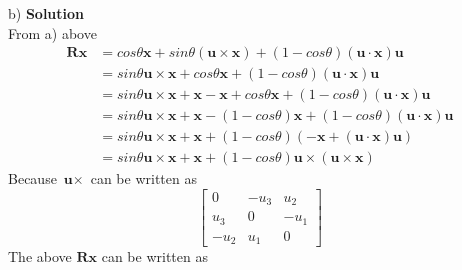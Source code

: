 \documentclass[letterpaper, 11pt]{article}
\begin{document}
b)
\textbf{Solution}\\
From a) above
\begin{align*}
    \textbf{R}\textbf{x} & =cos\theta\textbf{x} + sin\theta (\textbf{u} \times  \textbf{x}) +
    (1-cos\theta)(\textbf{u} \cdot \textbf{x})\textbf{u}                                                              \\
                         & = sin\theta \textbf{u} \times  \textbf{x}+cos\theta\textbf{x} +
    (1-cos\theta)(\textbf{u} \cdot \textbf{x})\textbf{u}                                                              \\
                         & = sin\theta \textbf{u} \times  \textbf{x}+ \textbf{x} - \textbf{x} + cos\theta\textbf{x} +
    (1-cos\theta)(\textbf{u} \cdot \textbf{x})\textbf{u}                                                              \\
                         & = sin\theta \textbf{u} \times  \textbf{x}+ \textbf{x} - (1-cos\theta)\textbf{x} +
    (1-cos\theta)(\textbf{u} \cdot \textbf{x})\textbf{u}                                                              \\
                         & = sin\theta \textbf{u} \times  \textbf{x}+ \textbf{x} + (1-cos\theta)(-\textbf{x} +
    (\textbf{u} \cdot \textbf{x})\textbf{u})                                                                          \\
                         & = sin\theta \textbf{u} \times  \textbf{x}+ \textbf{x} + (1-cos\theta)
    \textbf{u} \times (\textbf{u} \times \textbf{x})
\end{align*}
Because $\textbf{u}\times$ can be written as
$$
    \begin{bmatrix}
        0    & -u_3 & u_2  \\
        u_3  & 0    & -u_1 \\
        -u_2 & u_1  & 0
    \end{bmatrix}
$$
The above $\textbf{R}\textbf{x}$ can be written as
\end{document}
